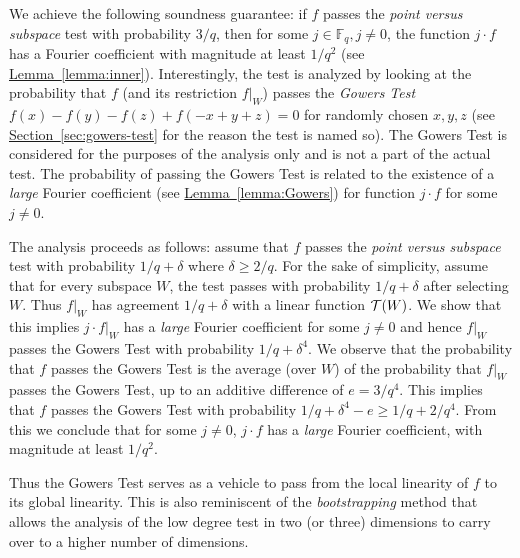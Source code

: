 \documentclass[10pt]{article}
\theoremstyle{definition}
\numberwithin{equation}{section}
\newcommand{\expref}[2]{\texorpdfstring{\hyperref[#2]{#1~\ref{#2}}}{#1~\ref{#2}}}
\newcommand\calT{{\cal T}}
\newcommand\F{\mathbb{F}}
\begin{document}
We achieve the following soundness guarantee: if $f$ passes the \emph{point versus subspace}
test with probability ${3}/{q}$, then for some $j \in \F_q, j \not= 0$,
the function $j\cdot f$ has a Fourier coefficient with magnitude at least ${1}/{q^2}$
(see \expref{Lemma}{lemma:inner}). Interestingly, the test is analyzed by looking at the
probability that $f$ (and its restriction $f|_W$) passes the \emph{Gowers Test}
$f(x) - f(y) - f(z) + f(-x+y+z)=0$ for randomly chosen $x,y,z$ (see \expref{Section}{sec:gowers-test} for the reason the test is named so).
The Gowers Test is considered
for the purposes of the analysis only and is not a part of the actual test. The probability
of passing the Gowers Test is related to the existence of a \emph{large} Fourier coefficient
(see \expref{Lemma}{lemma:Gowers}) for function $j\cdot f$ for some $j \not= 0$.

The analysis proceeds as follows: assume that $f$ passes the \emph{point versus subspace}
test with probability ${1}/{q}+\delta$ where $\delta \geq {2}/{q}$. For the sake of
simplicity, assume that for every subspace $W$,
the test passes with probability ${1}/{q}+\delta$ after selecting $W$. Thus
$f|_W$ has agreement ${1}/{q}+\delta$ with a linear function $\calT(W)$.
We show that
this implies $j \cdot f|_W$ has a \emph{large} Fourier coefficient for some $j \not= 0$
and hence
$f|_W$ passes the Gowers Test with probability
${1}/{q}+\delta^4$. We observe that the probability that $f$ passes the Gowers Test is the average (over $W$)  of the probability that $f|_W$ passes the Gowers Test, up to an additive difference of
$e = {3}/{q^4}$. This implies that $f$ passes the Gowers Test with probability
${1}/{q} + \delta^4 - e \geq {1}/{q} + {2}/{q^4}$. {}From this we conclude that
for some $j \not= 0$, $j \cdot f$ has a \emph{large} Fourier coefficient, with magnitude
at least ${1}/{q^2}$.

Thus the Gowers Test serves as a vehicle to pass
from the local linearity of $f$ to its global linearity. This is also reminiscent of the
\emph{bootstrapping} method that allows the analysis of the low degree test in two (or three)
dimensions to carry over to a higher number of dimensions.
\end{document}

